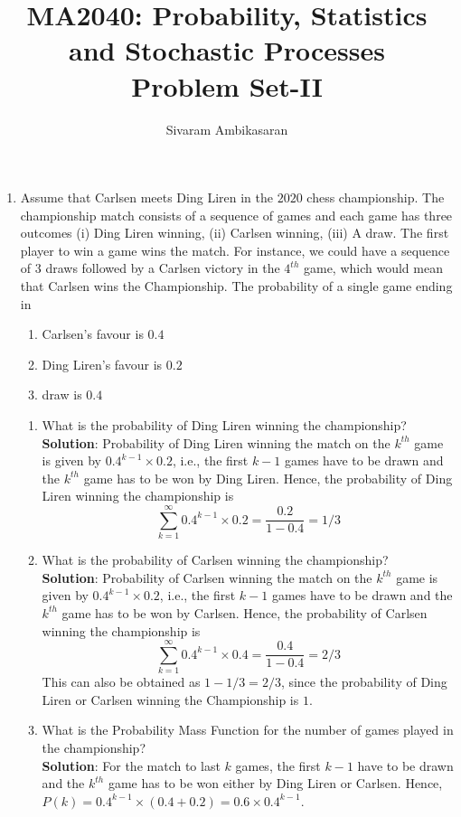 \documentclass{article}
\title{MA2040: Probability, Statistics and Stochastic Processes\\
Problem Set-II}
\author{Sivaram Ambikasaran}
\newcommand{\dsum}{\displaystyle\sum}
\newcommand{\bkt}[1]{\left(#1\right)}
\newcommand{\soln}[1]{\textbf{Solution}:#1}
\begin{document}
	\maketitle
	\begin{enumerate}
		\item
		Assume that Carlsen meets Ding Liren in the $2020$ chess championship. The championship match consists of a sequence of games and each game has three outcomes (i) Ding Liren winning, (ii) Carlsen winning, (iii) A draw. The first player to win a game wins the match. For instance, we could have a sequence of $3$ draws followed by a Carlsen victory in the $4^{th}$ game, which would mean that Carlsen wins the Championship. The probability of a single game ending in
		\begin{enumerate}
			\item
			Carlsen's favour is $0.4$
			\item
			Ding Liren's favour is $0.2$
			\item
			draw is $0.4$
		\end{enumerate}
		\begin{enumerate}[i]
			\item
			What is the probability of Ding Liren winning the championship?\\
			\soln{
			Probability of Ding Liren winning the match on the $k^{th}$ game is given by $0.4^{k-1} \times 0.2$, i.e., the first $k-1$ games have to be drawn and the $k^{th}$ game has to be won by Ding Liren. Hence, the probability of Ding Liren winning the championship is
			$$\dsum_{k=1}^{\infty} 0.4^{k-1} \times 0.2 = \dfrac{0.2}{1-0.4} = 1/3$$
			}
			\item
			What is the probability of Carlsen winning the championship?\\
			\soln{
			Probability of Carlsen winning the match on the $k^{th}$ game is given by $0.4^{k-1} \times 0.2$, i.e., the first $k-1$ games have to be drawn and the $k^{th}$ game has to be won by Carlsen. Hence, the probability of Carlsen winning the championship is
			$$\dsum_{k=1}^{\infty} 0.4^{k-1} \times 0.4 = \dfrac{0.4}{1-0.4} = 2/3$$
			This can also be obtained as $1-1/3=2/3$, since the probability of Ding Liren or Carlsen winning the Championship is $1$.
			}
			\item
			What is the Probability Mass Function for the number of games played in the championship?\\
			\soln{
			For the match to last $k$ games, the first $k-1$ have to be drawn and the $k^{th}$ game has to be won either by Ding Liren or Carlsen. Hence, $P(k) = 0.4^{k-1}\times\bkt{0.4+0.2} = 0.6 \times 0.4^{k-1}$.
}
\end{enumerate}
\end{enumerate}
\end{document}
